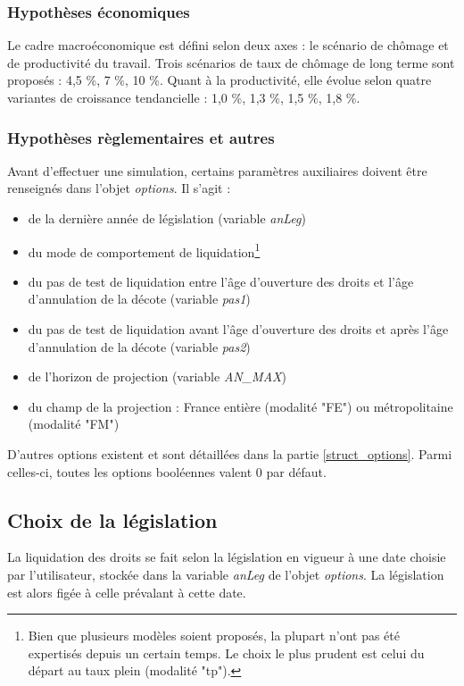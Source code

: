 \subsubsection{Hypothèses économiques}
Le cadre macroéconomique est défini selon deux axes : le scénario de chômage et de productivité du travail. Trois scénarios de taux de chômage de long terme sont proposés : 4,5 \%, 7 \%, 10 \%. Quant à la productivité, elle évolue selon quatre variantes de croissance tendancielle : 1,0 \%, 1,3 \%, 1,5 \%, 1,8 \%.

\subsubsection{Hypothèses règlementaires et autres}
Avant d'effectuer une simulation, certains paramètres auxiliaires doivent être renseignés dans l'objet \textit{options}. Il s'agit :
\begin{itemize}
\item de la dernière année de législation (variable \textit{anLeg})
\item du mode de comportement de liquidation\footnote{Bien que plusieurs modèles soient proposés, la plupart n'ont pas été expertisés depuis un certain temps. Le choix le plus prudent est celui du départ au taux plein (modalité "tp").}
\item du pas de test de liquidation entre l'âge d'ouverture des droits et l'âge d'annulation de la décote (variable \textit{pas1})
\item du pas de test de liquidation avant l'âge d'ouverture des droits et après l'âge d'annulation de la décote (variable \textit{pas2})
\item de l'horizon de projection (variable \textit{AN\_MAX})
\item du champ de la projection : France entière (modalité "FE") ou métropolitaine (modalité "FM")
\end{itemize}
D'autres options existent et sont détaillées dans la partie \ref{struct_options}. Parmi celles-ci, toutes les options booléennes valent 0 par défaut.

\subsection{Choix de la législation}
La liquidation des droits se fait selon la législation en vigueur à une date choisie par l'utilisateur, stockée dans la variable \textit{anLeg} de l'objet \textit{options}. La législation est alors figée à celle prévalant à cette date.


